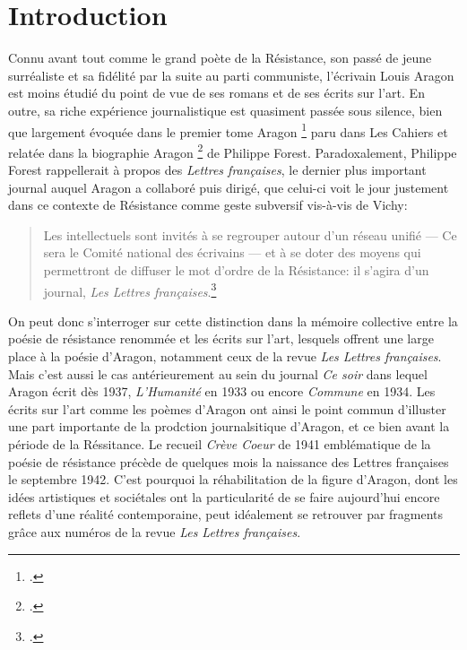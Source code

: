 \chapter*{Introduction} 

Connu avant tout comme le grand poète de la Résistance, son passé de jeune surréaliste et sa fidélité par la suite au parti communiste, l'écrivain Louis Aragon est moins étudié du point de vue de ses romans et de ses écrits sur l'art. En outre, sa riche expérience journalistique est quasiment passée sous silence, bien que largement évoquée dans le premier tome Aragon \footcite[]{cahiers} paru dans Les Cahiers et relatée dans la biographie Aragon \footcite[]{biographie}  de Philippe Forest. Paradoxalement, Philippe Forest rappellerait à propos des \emph{Lettres françaises}, le dernier plus important journal auquel Aragon a collaboré puis dirigé, que celui-ci voit le jour justement dans ce contexte de Résistance comme geste subversif vis-à-vis de Vichy:
\begin{quote} 
Les intellectuels sont invités à se regrouper autour d'un réseau unifié --- Ce sera le Comité national des écrivains --- et à se doter des moyens qui permettront de diffuser le mot d'ordre de la Résistance: il s'agira d'un journal, \emph{Les Lettres françaises}.\footcite[]{biographie}
\end{quote}
On peut donc s'interroger sur cette distinction dans la mémoire collective entre la poésie de résistance renommée et les écrits sur l'art, lesquels offrent une large place à la poésie d'Aragon, notamment ceux de la revue \emph{Les Lettres françaises}. Mais c'est aussi le cas antérieurement au sein du journal \emph{Ce soir} dans lequel Aragon écrit dès 1937, \emph{L'Humanité} en 1933 ou encore \emph{Commune} en 1934. Les écrits sur l'art comme les poèmes d'Aragon ont ainsi le point commun d'illuster une part importante de la prodction journalsitique d'Aragon, et ce bien avant la période de la Réssitance. Le recueil \emph{Crève Coeur }de 1941 emblématique de la poésie de résistance précède de quelques mois la naissance des Lettres françaises le septembre 1942. C'est pourquoi la réhabilitation de la figure d'Aragon, dont les idées artistiques et sociétales ont la particularité de se faire aujourd'hui encore reflets d'une réalité contemporaine, peut idéalement se retrouver par fragments grâce aux numéros de la revue \emph{Les Lettres françaises}.


